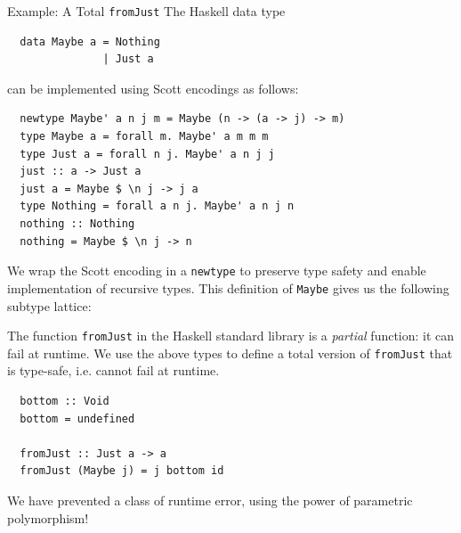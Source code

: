 \documentclass[final]{beamer}
\begin{document}
\begin{frame}[fragile]
\begin{columns}
\begin{column}{.33\textwidth}
\begin{block}{Example: A Total \texttt{fromJust}}
\vspace{0.5cm}
The Haskell data type

\begin{verbatim}
  data Maybe a = Nothing
               | Just a
\end{verbatim}

can be implemented using Scott encodings as follows:

\begin{verbatim}
  newtype Maybe' a n j m = Maybe (n -> (a -> j) -> m)
  type Maybe a = forall m. Maybe' a m m m 
  type Just a = forall n j. Maybe' a n j j
  just :: a -> Just a
  just a = Maybe $ \n j -> j a
  type Nothing = forall a n j. Maybe' a n j n
  nothing :: Nothing
  nothing = Maybe $ \n j -> n
\end{verbatim}

We wrap the Scott encoding in a \texttt{newtype} to preserve type safety and
enable implementation of recursive types. This definition of \texttt{Maybe}
gives us the following subtype lattice:

\begin{figure}[!h]
\centering
{}
\end{figure}

The function \texttt{fromJust} in the Haskell standard library is a
\emph{partial} function: it can fail at runtime. We use the above types to
define a total version of \texttt{fromJust} that is type-safe, i.e. cannot
fail at runtime.

\begin{verbatim}
  bottom :: Void
  bottom = undefined

  fromJust :: Just a -> a
  fromJust (Maybe j) = j bottom id 
\end{verbatim}

We have prevented a class of runtime error, using the power of parametric
polymorphism!

\end{block}


\end{column}
\end{columns}
\end{frame}
\end{document}

